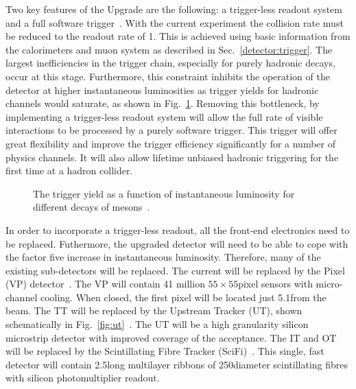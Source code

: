 Two key features of the \lhcb Upgrade are the following: a trigger-less readout system and a full software trigger~\cite{upgrade-trigger-tdr}. With the current experiment the collision rate must be reduced to the readout rate of 1\mhz. This is achieved using basic information from the calorimeters and muon system as described in Sec.~\ref{detector:trigger}. The largest inefficiencies in the trigger chain, especially for purely hadronic decays, occur at this stage. Furthermore, this constraint inhibits the operation of the detector at higher instantaneous luminosities as trigger yields for hadronic channels would saturate, as shown in Fig.~\ref{fig:upgrade-motivation}. Removing this bottleneck, by implementing a trigger-less readout system will allow the full rate of visible interactions to be processed by a purely software trigger. This trigger will offer great flexibility and improve the trigger efficiency significantly for a number of physics channels. It will also allow lifetime unbiased hadronic triggering for the first time at a hadron collider.

\begin{figure}[!tb]
\centering
{}
\caption{The trigger yield as a function of instantaneous luminosity for different decays of \B mesons~\cite{upgrade-loi}.}
\label{fig:upgrade-motivation}
\end{figure}

In order to incorporate a trigger-less readout, all the front-end electronics need to be replaced. Futhermore, the upgraded detector will need to be able to cope with the factor five increase in instantaneous luminosity. Therefore, many of the existing sub-detectors will be replaced. The current \velo will be replaced by the \velo Pixel (VP) detector~\cite{upgrade-velo-tdr}. The VP will contain 41 million $55\times55$\mum pixel sensors with micro-channel \cotwo cooling. When closed, the first pixel will be located just 5.1\mm from the \lhcb beam. The TT will be replaced by the Upstream Tracker (UT), shown schematically in Fig.~\ref{fig:ut}~\cite{upgrade-tracker-tdr}. The UT will be a high granularity silicon microstrip detector with improved coverage of the \lhcb acceptance. The IT and OT will be replaced by the Scintillating Fibre Tracker (SciFi)~\cite{upgrade-tracker-tdr}. This single, fast detector will contain 2.5\m long multilayer ribbons of 250\mum diameter scintillating fibres with silicon photomultiplier readout.

